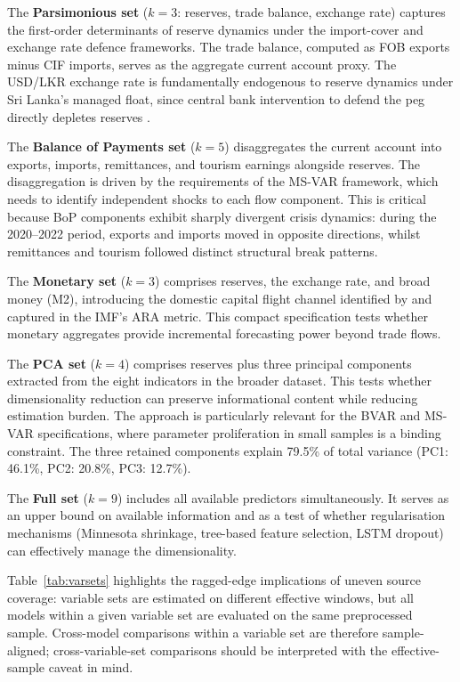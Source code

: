 \documentclass[12pt,a4paper]{article}
\begin{document}
The \textbf{Parsimonious set} ($k=3$: reserves, trade balance, exchange rate) captures the first-order determinants of reserve dynamics under the import-cover and exchange rate defence frameworks. The trade balance, computed as FOB exports minus CIF imports, serves as the aggregate current account proxy. The USD/LKR exchange rate is fundamentally endogenous to reserve dynamics under Sri Lanka's managed float, since central bank intervention to defend the peg directly depletes reserves \citep{Obstfeld2010}.

The \textbf{Balance of Payments set} ($k=5$) disaggregates the current account into exports, imports, remittances, and tourism earnings alongside reserves. The disaggregation is driven by the requirements of the MS-VAR framework, which needs to identify independent shocks to each flow component. This is critical because BoP components exhibit sharply divergent crisis dynamics: during the 2020--2022 period, exports and imports moved in opposite directions, whilst remittances and tourism followed distinct structural break patterns.

The \textbf{Monetary set} ($k=3$) comprises reserves, the exchange rate, and broad money (M2), introducing the domestic capital flight channel identified by \cite{Obstfeld2010} and captured in the IMF's ARA metric. This compact specification tests whether monetary aggregates provide incremental forecasting power beyond trade flows.

The \textbf{PCA set} ($k=4$) comprises reserves plus three principal components extracted from the eight indicators in the broader dataset. This tests whether dimensionality reduction can preserve informational content while reducing estimation burden. The approach is particularly relevant for the BVAR and MS-VAR specifications, where parameter proliferation in small samples is a binding constraint. The three retained components explain 79.5\% of total variance (PC1: 46.1\%, PC2: 20.8\%, PC3: 12.7\%).

The \textbf{Full set} ($k=9$) includes all available predictors simultaneously. It serves as an upper bound on available information and as a test of whether regularisation mechanisms (Minnesota shrinkage, tree-based feature selection, LSTM dropout) can effectively manage the dimensionality.

Table~\ref{tab:varsets} highlights the ragged-edge implications of uneven source coverage: variable sets are estimated on different effective windows, but all models within a given variable set are evaluated on the same preprocessed sample. Cross-model comparisons within a variable set are therefore sample-aligned; cross-variable-set comparisons should be interpreted with the effective-sample caveat in mind.
\end{document}

